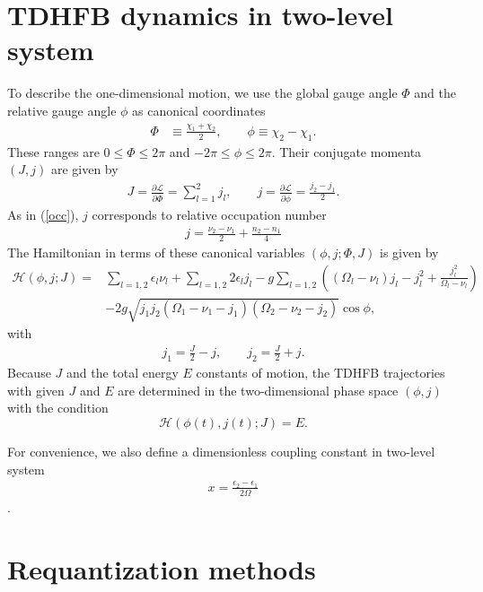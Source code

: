 \documentclass[11pt]{book} %
\begin{document}
\section{TDHFB dynamics in two-level system}
To describe the one-dimensional motion, we use the global gauge angle $\Phi$ and the relative gauge angle $\phi$ as canonical coordinates
\begin{align}
  \Phi &\equiv \frac{\chi_1 + \chi_2}{2}, \quad\quad
  \phi\equiv \chi_2 - \chi_1.
\label{phi}
\end{align}
These ranges are $0\leq \Phi \leq 2\pi$ and $-2\pi \leq \phi \leq 2\pi$. 
Their conjugate momenta $(J,j)$ are given by
\begin{align}
	J = \frac{\partial\mathcal{L}}{\partial\dot{\Phi}} =  \sum_{l=1}^2 j_l, 
 \quad\quad
j = \frac{\partial\mathcal{L}}{\partial\dot{\phi}} = \frac{j_2 - j_1}{2}.
	\label{pi}
\end{align}
As in (\ref{occ}), $j$ corresponds to relative occupation number
\begin{align}
  j = \frac{\nu_{2}-\nu_{1}}{2} + \frac{n_{2}-n_{1}}{4}
\end{align}
The Hamiltonian in terms of these canonical variables
$(\phi,j;\Phi,J)$ is given by
\begin{align}
	\mathcal{H}(\phi,j;J)
	=& \sum_{l=1,2} \epsilon_l\nu_l + \sum_{l=1,2} 2\epsilon_lj_l - g\sum_{l=1,2} \left( (\Omega_l-\nu_l) j_l - j_l^2 +\frac{j_l^2}{\Omega_l-\nu_l} \right) \nonumber \\
	&- 2g\sqrt{j_1j_2(\Omega_{1}-\nu_{1}-j_{1})(\Omega_{2}-\nu_{2}-j_{2})}\cos{\phi} , 
\label{Hamiltonian2}
\end{align}
with 
\begin{align}
	j_1 = \frac{J}{2} - j, \quad\quad j_2 = \frac{J}{2} + j .
\end{align}
Because $J$ and the total energy $E$ constants of motion, the TDHFB trajectories with given $J$ and $E$ are determined
in the two-dimensional phase space $(\phi,j)$ with the condition
\begin{equation}
  \mathcal{H}(\phi(t),j(t);J) = E.
\end{equation}

For convenience, we also define a dimensionless coupling constant in two-level system
\begin{align}
	x = \frac{\epsilon_2 - \epsilon_1}{2\Omega}
\end{align}.

\section{Requantization methods}
\end{document}
